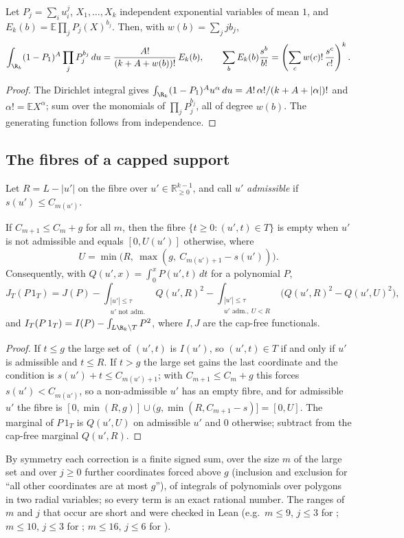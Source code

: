 \begin{lemma}\label{lem:egf}
Let $P_j=\sum_iu_i^j$, $X_1,\dots,X_k$ independent exponential variables of
mean $1$, and $E_k(b)=\mathbb E\prod_jP_j(X)^{b_j}$. Then, with
$w(b)=\sum_jjb_j$,
\[
\int_{\R_k}(1-P_1)^A\prod_jP_j^{b_j}\,du=\frac{A!}{(k+A+w(b))!}\,E_k(b),
\qquad
\sum_bE_k(b)\frac{s^b}{b!}=\left(\sum_c w(c)!\,\frac{s^c}{c!}\right)^{k}.
\]
\end{lemma}

\begin{proof}
The Dirichlet integral gives $\int_{\R_k}(1-P_1)^Au^\alpha\,du=A!\,\alpha!/(k+A+|\alpha|)!$
and $\alpha!=\mathbb EX^\alpha$; sum over the monomials of $\prod_jP_j^{b_j}$,
all of degree $w(b)$. The generating function follows from independence.
\end{proof}

\subsection*{The fibres of a capped support}
Let $R=L-|u'|$ on the fibre over $u'\in\mathbb R^{k-1}_{\ge0}$, and call $u'$
\emph{admissible} if $s(u')\le C_{m(u')}$.

\begin{proposition}\label{prop:fibre}
If $C_{m+1}\le C_m+g$ for all $m$, then the fibre $\{t\ge0:(u',t)\in T\}$ is
empty when $u'$ is not admissible and equals $[0,U(u')]$ otherwise, where
\[
U=\min\bigl(R,\ \max(g,\ C_{m(u')+1}-s(u'))\bigr).
\]
Consequently, with $Q(u',x)=\int_0^xP(u',t)\,dt$ for a polynomial $P$,
\[
J_T(P\,1_T)=J(P)-\int_{\substack{|u'|\le\tau\\ u'\text{ not adm.}}}Q(u',R)^2
-\int_{\substack{|u'|\le\tau\\ u'\text{ adm.},\ U<R}}\bigl(Q(u',R)^2-Q(u',U)^2\bigr),
\]
and $I_T(P\,1_T)=I(P)-\int_{L\R_k\setminus T}P^2$, where $I,J$ are the
cap-free functionals.
\end{proposition}

\begin{proof}
If $t\le g$ the large set of $(u',t)$ is $I(u')$, so $(u',t)\in T$ if and only
if $u'$ is admissible and $t\le R$. If $t>g$ the large set gains the last
coordinate and the condition is $s(u')+t\le C_{m(u')+1}$; with
$C_{m+1}\le C_m+g$ this forces $s(u')<C_{m(u')}$, so a non-admissible $u'$ has
an empty fibre, and for admissible $u'$ the fibre is
$[0,\min(R,g)]\cup(g,\min(R,C_{m+1}-s)]=[0,U]$. The marginal of $P\,1_T$ is
$Q(u',U)$ on admissible $u'$ and $0$ otherwise; subtract from the cap-free
marginal $Q(u',R)$.
\end{proof}

By symmetry each correction is a finite signed sum, over the size $m$ of the
large set and over $j\ge0$ further coordinates forced above $g$ (inclusion and
exclusion for ``all other coordinates are at most $g$''), of integrals of
polynomials over polygons in two radial variables; so every term is an exact
rational number. The ranges of $m$ and $j$ that occur are short and were
checked in Lean (e.g.\ $m\le9$, $j\le3$ for \cite{Sta26}; $m\le10$, $j\le3$
for \cite{Kin26}; $m\le16$, $j\le6$ for \cite{Cha26}).

